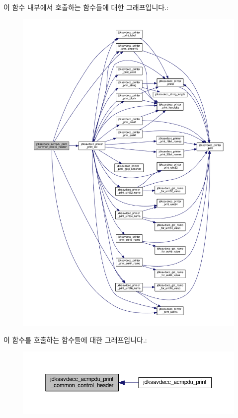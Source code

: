 이 함수 내부에서 호출하는 함수들에 대한 그래프입니다.\+:
\nopagebreak
\begin{figure}[H]
\begin{center}
\leavevmode
\includegraphics[width=350pt]{group__acmp__print_ga59ff2d8effe67485e7e29789dc92627e_cgraph}
\end{center}
\end{figure}




이 함수를 호출하는 함수들에 대한 그래프입니다.\+:
\nopagebreak
\begin{figure}[H]
\begin{center}
\leavevmode
\includegraphics[width=350pt]{group__acmp__print_ga59ff2d8effe67485e7e29789dc92627e_icgraph}
\end{center}
\end{figure}




